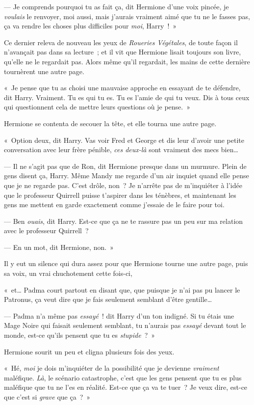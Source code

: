 --- Je comprends pourquoi tu as fait ça, dit Hermione d'une voix pincée, je \emph{voulais} le renvoyer, moi aussi, mais j'aurais vraiment aimé que tu ne le fasses pas, ça va rendre les choses plus difficiles pour \emph{moi}, Harry~!~»

Ce dernier releva de nouveau les yeux de \emph{Roueries Végétales}, de toute façon il n'avançait pas dans sa lecture~; et il vit que Hermione lisait toujours son livre, qu'elle ne le regardait pas. Alors même qu'il regardait, les mains de cette dernière tournèrent une autre page.

«~Je pense que tu as choisi une mauvaise approche en essayant de te défendre, dit Harry. Vraiment. Tu es qui tu es. Tu es l'amie de qui tu veux. Dis à tous ceux qui questionnent cela de mettre leurs questions où je pense.~»

Hermione se contenta de secouer la tête, et elle tourna une autre page.

«~Option deux, dit Harry. Vas voir Fred et George et dis leur d'avoir une petite conversation avec leur frère pénible, \emph{ces deux-là} sont vraiment des mecs bien…

--- Il ne s'agit pas que de Ron, dit Hermione presque dans un murmure. Plein de gens disent ça, Harry. Même Mandy me regarde d'un air inquiet quand elle pense que je ne regarde pas. C'est drôle, non~? Je n'arrête pas de m'inquiéter à l'idée que le professeur Quirrell puisse t'aspirer dans les ténèbres, et maintenant les gens me mettent en garde exactement comme j'essaie de le faire pour toi.

--- Ben \emph{ouais}, dit Harry. Est-ce que ça ne te rassure pas un peu sur ma relation avec le professeur Quirrell~?

--- En un mot, dit Hermione, non.~»

Il y eut un silence qui dura assez pour que Hermione tourne une autre page, puis sa voix, un vrai chuchotement cette fois-ci,

«~et… Padma court partout en disant que, que puisque je n'ai pas pu lancer le Patronus, ça veut dire que je fais seulement semblant d'être gentille…

--- Padma n'a même pas \emph{essayé}~! dit Harry d'un ton indigné. Si tu étais une Mage Noire qui faisait seulement semblant, tu n'aurais pas \emph{essayé} devant tout le monde, est-ce qu'ils pensent que tu es \emph{stupide}~?~»

Hermione sourit un peu et cligna plusieurs fois des yeux.

«~Hé, \emph{moi} je dois m'inquiéter de la possibilité que je devienne \emph{vraiment} maléfique. \emph{Là}, le scénario catastrophe, c'est que les gens pensent que tu es plus maléfique que tu ne l'es en réalité. Est-ce que ça va te tuer~? Je veux dire, est-ce que c'est si \emph{grave} que ça~?~»

